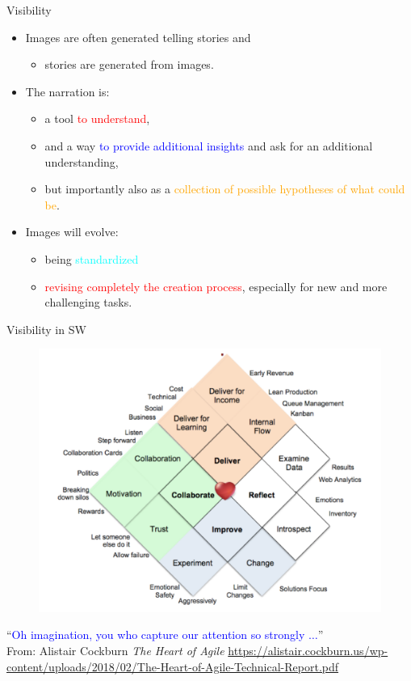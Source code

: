 \documentclass{beamer}
\begin{document}
\begin{frame}
{\centerline{Visibility}}

\begin{itemize}
    \item Images are often generated telling stories and 
    \begin{itemize}
    \item stories are generated from images.
    \end{itemize}
    \item The narration is:
\begin{itemize}
    \item a tool \textcolor{red}{to understand},
    \item and a way \textcolor{blue}{to provide additional insights} and ask for an additional understanding,
    \item but importantly  also as a \textcolor{orange}{collection of possible hypotheses of what could be}.
\end{itemize}
\item Images will evolve:
\begin{itemize}
    \item being \textcolor{cyan}{standardized}
    \item \textcolor{red}{revising completely the creation process}, especially for new and more challenging tasks.
\end{itemize}
\end{itemize}

\end{frame}

\begin{frame}
{\centerline{Visibility in SW}}

\begin{figure}[htp]
    \centering
     \includegraphics[width=.68\textwidth]{P2023.AIBCCSS.StoryTelling/HeartOfAgile.png}
    \label{F:HeartOfAgile}
\end{figure}
\vspace{-0.2cm}

\begin{center}
``\textcolor{blue}{Oh imagination, you who capture our attention so strongly $\ldots{}$}'' \\
\tiny{From: Alistair Cockburn \textit{The Heart of Agile}
 \url{https://alistair.cockburn.us/wp-content/uploads/2018/02/The-Heart-of-Agile-Technical-Report.pdf}}

\end{center}

\end{frame}
\end{document}
